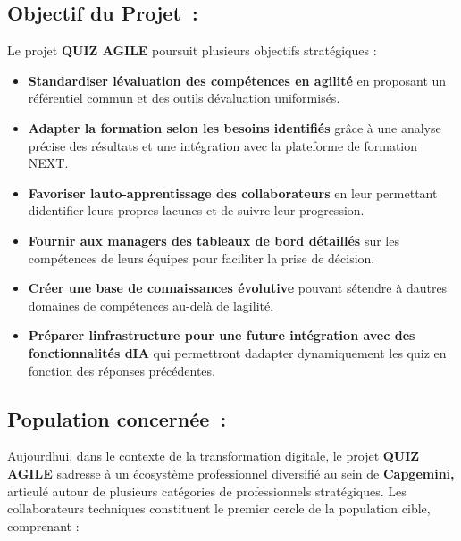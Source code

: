 \documentclass[12pt,a4paper,twoside,openright]{report}
\begin{document}
\hypertarget{objectif-du-projet}{%
\subsection{Objectif du Projet~:~}\label{objectif-du-projet}}

Le projet \textbf{QUIZ AGILE} poursuit plusieurs objectifs stratégiques
:

\begin{itemize}
\item
  \textbf{Standardiser l\textquotesingle évaluation des compétences en
  agilité} en proposant un référentiel commun et des outils
  d\textquotesingle évaluation uniformisés.
\item
  \textbf{Adapter la formation selon les besoins identifiés} grâce à une
  analyse précise des résultats et une intégration avec la plateforme de
  formation NEXT.
\item
  \textbf{Favoriser l\textquotesingle auto-apprentissage des
  collaborateurs} en leur permettant d\textquotesingle identifier leurs
  propres lacunes et de suivre leur progression.
\item
  \textbf{Fournir aux managers des tableaux de bord détaillés} sur les
  compétences de leurs équipes pour faciliter la prise de décision.
\item
  \textbf{Créer une base de connaissances évolutive} pouvant
  s\textquotesingle étendre à d\textquotesingle autres domaines de
  compétences au-delà de l\textquotesingle agilité.
\item
  \textbf{Préparer l\textquotesingle infrastructure pour une future
  intégration avec des fonctionnalités d\textquotesingle IA} qui
  permettront d\textquotesingle adapter dynamiquement les quiz en
  fonction des réponses précédentes.
\end{itemize}

\hypertarget{population-concernee}{%
\subsection{Population concernée~:}\label{population-concernee}}

Aujourd\textquotesingle hui, dans le contexte de la transformation
digitale, le projet \textbf{QUIZ AGILE} s\textquotesingle adresse à un
écosystème professionnel diversifié au sein de \textbf{Capgemini,}
articulé autour de plusieurs catégories de professionnels stratégiques.
Les collaborateurs techniques constituent le premier cercle de la
population cible, comprenant :
\end{document}
